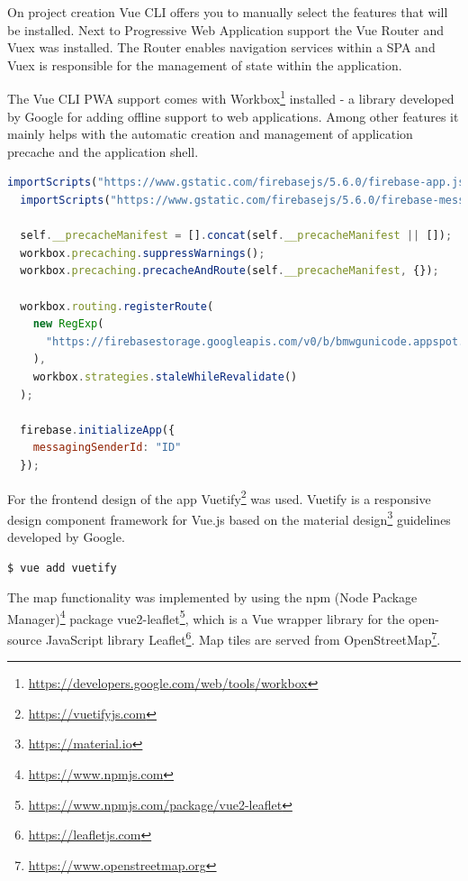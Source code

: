 On project creation Vue CLI offers you to manually select the features that will be installed. Next to Progressive Web Application support the Vue Router and Vuex was installed. The Router enables navigation services within a SPA and Vuex is responsible for the management of state within the application.


The Vue CLI PWA support comes with Workbox\footnote{\url{https://developers.google.com/web/tools/workbox}} installed - a library developed by Google for adding offline support to web applications. Among other features it mainly helps with the automatic creation and management of application precache and the application shell.

\pagebreak

\begin{lstlisting}[language=JavaScript, caption=Service Worker with Workbox and Firebase specific initiation (firebase-messaging-sw.js), label=lst:serviceworker]
  importScripts("https://www.gstatic.com/firebasejs/5.6.0/firebase-app.js");
  importScripts("https://www.gstatic.com/firebasejs/5.6.0/firebase-messaging.js");

  self.__precacheManifest = [].concat(self.__precacheManifest || []);
  workbox.precaching.suppressWarnings();
  workbox.precaching.precacheAndRoute(self.__precacheManifest, {});

  workbox.routing.registerRoute(
    new RegExp(
      "https://firebasestorage.googleapis.com/v0/b/bmwgunicode.appspot.com/.*"
    ),
    workbox.strategies.staleWhileRevalidate()
  );

  firebase.initializeApp({
    messagingSenderId: "ID"
  });

\end{lstlisting}

For the frontend design of the app Vuetify\footnote{\url{https://vuetifyjs.com}} was used. Vuetify is a responsive design component framework for Vue.js based on the material design\footnote{\url{https://material.io}} guidelines developed by Google.

\begin{lstlisting}[language=bash, caption=Command to add Vuetify to a Vue.js project, label=lst:vuetify]
  $ vue add vuetify
\end{lstlisting}

The map functionality was implemented by using the npm (Node Package Manager)\footnote{\url{https://www.npmjs.com}} package vue2-leaflet\footnote{\url{https://www.npmjs.com/package/vue2-leaflet}}, which is a Vue wrapper library for the open-source JavaScript library Leaflet\footnote{\url{https://leafletjs.com}}. Map tiles are served from OpenStreetMap\footnote{\url{https://www.openstreetmap.org}}.

